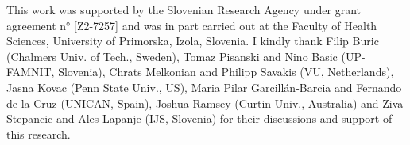 \documentclass[sigconf]{acmart}
\begin{document}
\begin{acks}
This work was supported by the Slovenian Research Agency under grant agreement n° [Z2-7257] and was in part carried out at the Faculty of Health Sciences, University of Primorska, Izola, Slovenia. I kindly thank Filip Buric (Chalmers Univ. of Tech., Sweden), Tomaz Pisanski and Nino Basic (UP-FAMNIT, Slovenia), Chrats Melkonian and Philipp Savakis (VU, Netherlands), Jasna Kovac (Penn State Univ., US), Maria Pilar Garcillán-Barcia and Fernando de la Cruz (UNICAN, Spain), Joshua Ramsey (Curtin Univ., Australia) and Ziva Stepancic and Ales Lapanje (IJS, Slovenia) for their discussions and support of this research.
\end{acks}



\end{document}
